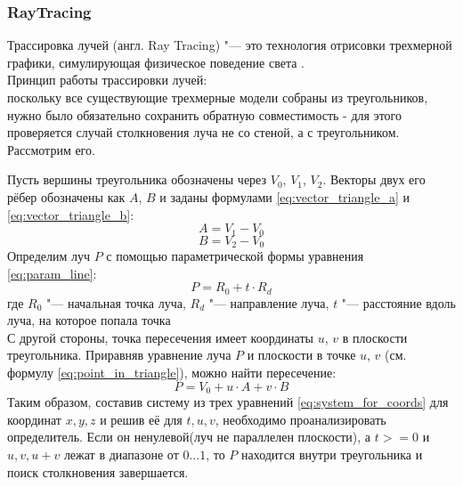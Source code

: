 \subsubsection{RayTracing}
Трассировка лучей (англ. Ray Tracing) "--- это технология отрисовки трехмерной графики, симулирующая физическое поведение света \cite{article:who_to_work_raytrace}.\\
Принцип работы трассировки лучей:\\
поскольку все существующие трехмерные модели собраны из треугольников, 
нужно было обязательно сохранить обратную совместимость - для этого проверяется случай столкновения луча не со стеной, а с треугольником.
Рассмотрим его.
\begin{eqndesc}
Пусть вершины треугольника обозначены через $V_0$, $V_1$, $V_2$.
Векторы двух его рёбер обозначены как $A$, $B$ и заданы формулами \ref{eq:vector_triangle_a} и \ref{eq:vector_triangle_b}:\\
\begin{equation} \label{eq:vector_triangle_a}
  A = V_1 - V_0
\end{equation}
\begin{equation} \label{eq:vector_triangle_b}
  B = V_2 - V_0
\end{equation}
Определим луч $P$ с помощью параметрической формы уравнения \ref{eq:param_line}:
\begin{equation} \label{eq:param_line}
  P = R_0 + t \cdot R_d
\end{equation}
где $R_0$ "--- начальная точка луча, $R_d$ "--- направление луча, $t$ "--- расстояние вдоль луча, на которое попала точка\\
С другой стороны, точка пересечения имеет координаты $u$, $v$ в плоскости треугольника. Приравняв
уравнение луча $P$ и плоскости в точке $u$, $v$ (см. формулу \ref{eq:point_in_triangle}), можно найти пересечение:\\
\begin{equation} \label{eq:point_in_triangle}
  P = V_0 + u \cdot A + v \cdot B
\end{equation} 
Таким образом, составив систему из трех уравнений \ref{eq:system_for_coords} для координат $x, y, z$ и решив её для $t, u, v$, необходимо 
проанализировать определитель. Если он ненулевой(луч не параллелен плоскости), а $t >= 0$ и $u, v, u + v$ лежат в диапазоне от $0\dots1$, 
то $P$ находится внутри треугольника и поиск столкновения завершается.
 \\
\end{eqndesc}
\clearpage
